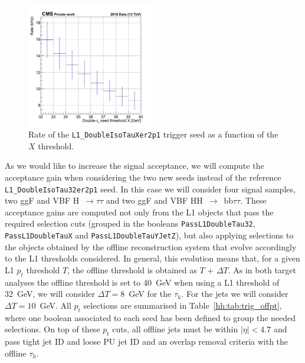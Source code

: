 \documentclass[../main.tex]{subfiles}
\begin{document}
\begin{figure}[h!]
\begin{center}
\includegraphics[width=0.5\textwidth]{Images/plot2D_ditau_sym_323755}
\end{center}
\caption{Rate of the \texttt{L1\_DoubleIsoTauXer2p1} trigger seed as a function of the $X$ threshold.}
\label{hh:fig:trig_ditau32_rate}
\end{figure}

As we would like to increase the signal acceptance, we will compute the acceptance gain when considering the two new seeds instead of the reference \texttt{L1\_Double\-IsoTau32\-er2p1} seed. In this case we will consider four signal samples, two ggF and VBF H~$\to\tau\tau$ and two ggF and VBF HH~$\to$~bb$\tau\tau$. These acceptance gains are computed not only from the L1 objects that pass the required selection cuts (grouped in the booleans \texttt{PassL1DoubleTau32}, \texttt{PassL1DoubleTauX} and \texttt{PassL1DoubleTauYJetZ}), but also applying selections to the objects obtained by the offline reconstruction system that evolve accordingly to the L1 thresholds considered. In general, this evolution means that, for a given L1 $p_t$ threshold $T$, the offline threshold is obtained as $T$ + $\Delta T$. As in both target analyses the offline threshold is set to 40~GeV when using a L1 threshold of 32~GeV, we will consider $\Delta T=8$~GeV for the $\tau_h$. For the jets we will consider $\Delta T=10$~GeV. All $p_t$ selections are summarised in Table~\ref{hh:tab:trig_offpt}, where one boolean associated to each seed has been defined to group the needed selections. On top of these $p_t$ cuts, all offline jets must be within $|\eta|<4.7$ and pass tight jet ID and loose PU jet ID and an overlap removal criteria with the offline $\tau_h$.
\end{document}
